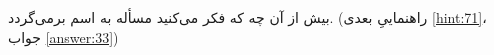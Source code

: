 \section{}
\paragraph{}\label{hint:340}
بیش از آن چه که فکر می‌کنید مسأله به اسم برمی‌گردد. (راهنماییِ بعدی \ref{hint:71}، جواب \ref{answer:33})